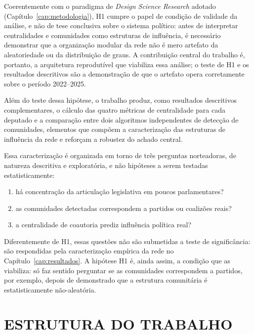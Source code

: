 \documentclass[
      12pt,
      a4paper,
      openright,
      oneside,
      chapter=TITLE,
      section=TITLE,
      english,
      french,
      spanish,
      brazilian
    ]{abntex2}
\begin{document}
    Coerentemente com o paradigma de \textit{Design Science Research} adotado (Capítulo~\ref{cap:metodologia}), H1 cumpre o papel de condição de validade da análise, e não de tese conclusiva sobre o sistema político: antes de interpretar centralidades e comunidades como estruturas de influência, é necessário demonstrar que a organização modular da rede não é mero artefato da aleatoriedade ou da distribuição de graus. A contribuição central do trabalho é, portanto, a arquitetura reprodutível que viabiliza essa análise; o teste de H1 e os resultados descritivos são a demonstração de que o artefato opera corretamente sobre o período 2022--2025.
    
    Além do teste dessa hipótese, o trabalho produz, como resultados descritivos complementares, o cálculo das quatro métricas de centralidade para cada deputado e a comparação entre dois algoritmos independentes de detecção de comunidades, elementos que compõem a caracterização das estruturas de influência da rede e reforçam a robustez do achado central.
    
    Essa caracterização é organizada em torno de três perguntas norteadoras, de natureza descritiva e exploratória, e não hipóteses a serem testadas estatisticamente:
    
    \begin{enumerate}[label=(\roman*)]
        \item há concentração da articulação legislativa em poucos parlamentares?
        \item as comunidades detectadas correspondem a partidos ou coalizões reais?
        \item a centralidade de coautoria prediz influência política real?
    \end{enumerate}
    
    \noindent Diferentemente de H1, essas questões não são submetidas a teste de significância: são respondidas pela caracterização empírica da rede no Capítulo~\ref{cap:resultados}. A hipótese H1 é, ainda assim, a condição que as viabiliza: só faz sentido perguntar se as comunidades correspondem a partidos, por exemplo, depois de demonstrado que a estrutura comunitária é estatisticamente não-aleatória.
    
    \section{ESTRUTURA DO TRABALHO}
    
\end{document}
